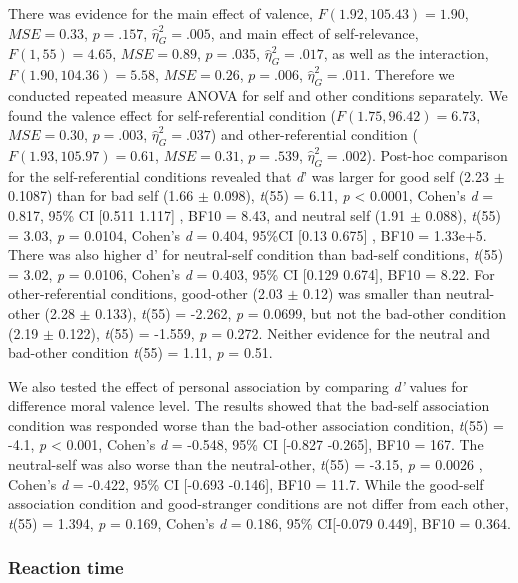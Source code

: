 \documentclass[
  english,
  man]{apa6}
\begin{document}
There was evidence for the main effect of valence, \(F(1.92, 105.43) = 1.90\), \(\mathit{MSE} = 0.33\), \(p = .157\), \(\hat{\eta}^2_G = .005\), and main effect of self-relevance, \(F(1, 55) = 4.65\), \(\mathit{MSE} = 0.89\), \(p = .035\), \(\hat{\eta}^2_G = .017\), as well as the interaction, \(F(1.90, 104.36) = 5.58\), \(\mathit{MSE} = 0.26\), \(p = .006\), \(\hat{\eta}^2_G = .011\). Therefore we conducted repeated measure ANOVA for self and other conditions separately. We found the valence effect for self-referential condition (\(F(1.75, 96.42) = 6.73\), \(\mathit{MSE} = 0.30\), \(p = .003\), \(\hat{\eta}^2_G = .037\)) and other-referential condition (\(F(1.93, 105.97) = 0.61\), \(\mathit{MSE} = 0.31\), \(p = .539\), \(\hat{\eta}^2_G = .002\)). Post-hoc comparison for the self-referential conditions revealed that \emph{d}' was larger for good self (2.23 \(\pm\) 0.1087) than for bad self (1.66 \(\pm\) 0.098), \emph{t}(55) = 6.11, \emph{p} \textless{} 0.0001, Cohen's \emph{d} = 0.817, 95\% CI {[}0.511 1.117{]} , BF10 = 8.43, and neutral self (1.91 \(\pm\) 0.088), \emph{t}(55) = 3.03, \emph{p} = 0.0104, Cohen's \emph{d} = 0.404, 95\%CI {[}0.13 0.675{]} , BF10 = 1.33e+5. There was also higher d' for neutral-self condition than bad-self conditions, \emph{t}(55) = 3.02, \emph{p} = 0.0106, Cohen's \emph{d} = 0.403, 95\% CI {[}0.129 0.674{]}, BF10 = 8.22. For other-referential conditions, good-other (2.03 \(\pm\) 0.12) was smaller than neutral-other (2.28 \(\pm\) 0.133), \emph{t}(55) = -2.262, \emph{p} = 0.0699, but not the bad-other condition (2.19 \(\pm\) 0.122), \emph{t}(55) = -1.559, \emph{p} = 0.272. Neither evidence for the neutral and bad-other condition \emph{t}(55) = 1.11, \emph{p} = 0.51.

We also tested the effect of personal association by comparing \emph{d'} values for difference moral valence level. The results showed that the bad-self association condition was responded worse than the bad-other association condition, \emph{t}(55) = -4.1, \emph{p} \textless{} 0.001, Cohen's \emph{d} = -0.548, 95\% CI {[}-0.827 -0.265{]}, BF10 = 167. The neutral-self was also worse than the neutral-other, \emph{t}(55) = -3.15, \emph{p} = 0.0026 , Cohen's \emph{d} = -0.422, 95\% CI {[}-0.693 -0.146{]}, BF10 = 11.7. While the good-self association condition and good-stranger conditions are not differ from each other, \emph{t}(55) = 1.394, \emph{p} = 0.169, Cohen's \emph{d} = 0.186, 95\% CI{[}-0.079 0.449{]}, BF10 = 0.364.

\hypertarget{reaction-time-4}{%
\subsubsection{Reaction time}\label{reaction-time-4}}
\end{document}
